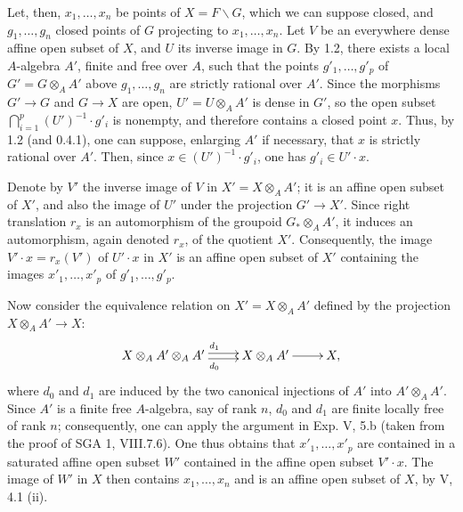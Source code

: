 Let, then, $x_1,\ldots,x_n$ be points of $X=F\backslash G$, which we can suppose closed, and $g_1,\ldots,g_n$ closed points of $G$ projecting to $x_1,\ldots,x_n$. Let $V$ be an everywhere dense affine open subset of $X$, and $U$ its inverse image in $G$. By 1.2, there exists a local $A$-algebra $A'$, finite and free over $A$, such that the points $g'_1,\ldots,g'_p$ of $G'=G\otimes_AA'$ above $g_1,\ldots,g_n$ are strictly rational over $A'$. Since the morphisms $G'\to G$ and $G\to X$ are open, $U'=U\otimes_AA'$ is dense in $G'$, so the open subset $\bigcap_{i=1}^p(U')^{-1}\cdot g'_i$ is nonempty, and therefore contains a closed point $x$. Thus, by 1.2 (and 0.4.1), one can suppose, enlarging $A'$ if necessary, that $x$ is strictly rational over $A'$. Then, since $x\in(U')^{-1}\cdot g'_i$, one has $g'_i\in U'\cdot x$.

Denote by $V'$ the inverse image of $V$ in $X'=X\otimes_AA'$; it is an affine open subset of $X'$, and also the image of $U'$ under the projection $G'\to X'$. Since right translation $r_x$ is an automorphism of the groupoid $G_*\otimes_AA'$, it induces an automorphism, again denoted $r_x$, of the quotient $X'$. Consequently, the image $V'\cdot x=r_x(V')$ of $U'\cdot x$ in $X'$ is an affine open subset of $X'$ containing the images $x'_1,\ldots,x'_p$ of $g'_1,\ldots,g'_p$.

Now consider the equivalence relation on $X'=X\otimes_AA'$ defined by the projection $X\otimes_AA'\to X$:
\[
\xymatrix{X\otimes_AA'\otimes_AA'\ar@<.5ex>[r]^{d_1}\ar@<-.5ex>[r]_{d_0}&X\otimes_AA'\ar[r]&X,}
\]
where $d_0$ and $d_1$ are induced by the two canonical injections of $A'$ into $A'\otimes_AA'$. Since $A'$ is a finite free $A$-algebra, say of rank $n$, $d_0$ and $d_1$ are finite locally free of rank $n$; consequently, one can apply the argument in Exp. V, 5.b (taken from the proof of SGA 1, VIII.7.6). One thus obtains that $x'_1,\ldots,x'_p$ are contained in a saturated affine open subset $W'$ contained in the affine open subset $V'\cdot x$. The image of $W'$ in $X$ then contains $x_1,\ldots,x_n$ and is an affine open subset of $X$, by V, 4.1 (ii).

